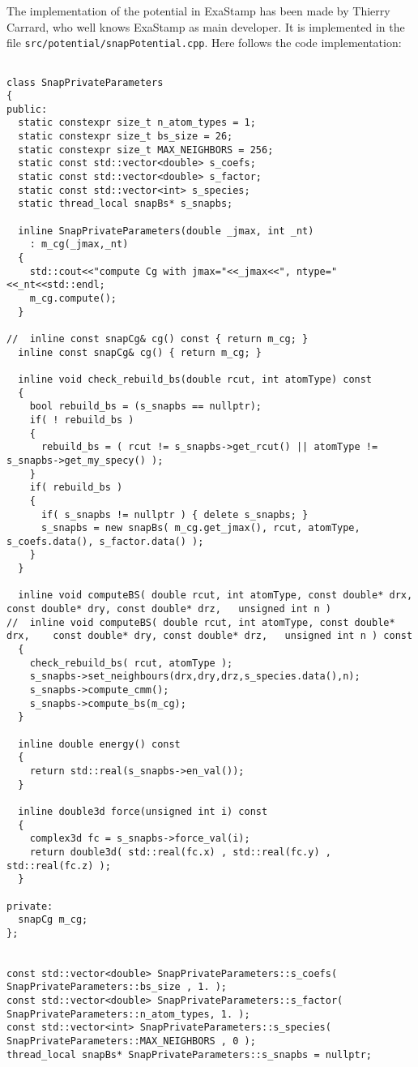 \documentclass[12pt]{article}
\begin{document}
The implementation of the potential in ExaStamp has been made by Thierry Carrard, who well knows ExaStamp as main developer. It is implemented in the file \verb=src/potential/snapPotential.cpp=. Here follows the code implementation: 
	\begin{lstlisting}

class SnapPrivateParameters
{
public:
  static constexpr size_t n_atom_types = 1;
  static constexpr size_t bs_size = 26;
  static constexpr size_t MAX_NEIGHBORS = 256;
  static const std::vector<double> s_coefs;
  static const std::vector<double> s_factor;
  static const std::vector<int> s_species;
  static thread_local snapBs* s_snapbs;

  inline SnapPrivateParameters(double _jmax, int _nt)
    : m_cg(_jmax,_nt)
  {
    std::cout<<"compute Cg with jmax="<<_jmax<<", ntype="<<_nt<<std::endl;
    m_cg.compute();
  }
  
//  inline const snapCg& cg() const { return m_cg; }
  inline const snapCg& cg() { return m_cg; }
  
  inline void check_rebuild_bs(double rcut, int atomType) const
  {
    bool rebuild_bs = (s_snapbs == nullptr);
    if( ! rebuild_bs )
    {
      rebuild_bs = ( rcut != s_snapbs->get_rcut() || atomType != s_snapbs->get_my_specy() );
    }
    if( rebuild_bs )
    {
      if( s_snapbs != nullptr ) { delete s_snapbs; }
      s_snapbs = new snapBs( m_cg.get_jmax(), rcut, atomType, s_coefs.data(), s_factor.data() );
    } 
  }
  
  inline void computeBS( double rcut, int atomType, const double* drx,	const double* dry, const double* drz,	unsigned int n )
//  inline void computeBS( double rcut, int atomType, const double* drx,	const double* dry, const double* drz,	unsigned int n ) const
  {
    check_rebuild_bs( rcut, atomType );
    s_snapbs->set_neighbours(drx,dry,drz,s_species.data(),n);
    s_snapbs->compute_cmm();
    s_snapbs->compute_bs(m_cg);
  }
  
  inline double energy() const
  {
    return std::real(s_snapbs->en_val());
  }

  inline double3d force(unsigned int i) const
  {
    complex3d fc = s_snapbs->force_val(i);
    return double3d( std::real(fc.x) , std::real(fc.y) , std::real(fc.z) );
  }
  
private:
  snapCg m_cg;
};


const std::vector<double> SnapPrivateParameters::s_coefs( SnapPrivateParameters::bs_size , 1. );
const std::vector<double> SnapPrivateParameters::s_factor( SnapPrivateParameters::n_atom_types, 1. );
const std::vector<int> SnapPrivateParameters::s_species( SnapPrivateParameters::MAX_NEIGHBORS , 0 );
thread_local snapBs* SnapPrivateParameters::s_snapbs = nullptr;



\end{lstlisting}
\end{document}
